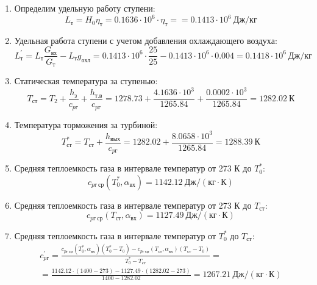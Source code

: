 \documentclass[a4paper,10pt]{article}
\begin{document}
\begin{enumerate}
        
        \item Определим удельную работу ступени:
        \[
            L_т = H_0 \eta_т = 0.1636 \cdot 10^6 \cdot \eta_т =
            = 0.1413 \cdot 10^6 \ Дж/кг
        \]
        

        \item Удельная работа ступени с учетом добавления охлаждающего воздуха:
        \[
            L_т^\prime = L_т \frac{ G_{вх} }{ G_т }  - L_т g_{охл} =
                0.1413 \cdot 10^6 \cdot
                \frac{ 25 }{ 25 }  -
                0.1413 \cdot 10^6 \cdot 0.004 =
            0.1418 \cdot 10^6 \ Дж/кг
        \]

        \item Статическая температура за ступенью:
        \[
            T_{ст} = T_2 + \frac{ h_з }{ c_{pг} } + \frac{ h_{т.в} }{ c_{pг} } =
                1278.73 +
                \frac{4.1636 \cdot 10^3 }{ 1265.84 } +
                \frac{ 0.0002 \cdot 10^3 }{ 1265.84 } =
            1282.02 \ К
        \]

        \item Температура торможения за турбиной:
        \[
            T_{ст}^* = T_{ст} + \frac{ h_{вых} }{ c_{pг} } =
                1282.02 +
                \frac{ 8.0658 \cdot 10^3 }{ 1265.84 } =
            1288.39 \ К
        \]

        \item Средняя теплоемкость газа в интервале температур от 273 К до $T_0^*$:
        \[
            c_{pг\ ср} (T_0^*, \alpha_{вх}) =
            1142.12 \ Дж/(кг \cdot К)
        \]

        \item Средняя теплоемкость газа в интервале температур от 273 К до $T_{ст}$:
        \[
            c_{pг\ ср} (T_{ст}, \alpha_{вх}) =
            1127.49 \ Дж/(кг \cdot К)
        \]

        \item Средняя теплоемкость газа в интервале температур от $T_0^*$ до $T_{ст}$:
        \begin{gather*}
            c_{pг}^\prime = \frac{
		        c_{pг\ ср} (T_0^*, \alpha_{вх}) (T_0^* - T_0) - c_{pг\ ср} (T_{ст}, \alpha_{вх})(T_{ст} - T_0)
		    }{
		        T_0^* - T_{ст}} =\\
            =\frac{
		        1142.12 \cdot
                (1400 - 273) -
		        1127.49 \cdot
                (1282.02 - 273)
		    }{
		        1400 - 1282.02} =
		    1267.21 \ Дж / (кг \cdot К)\\
        \end{gather*}


\end{enumerate}
\end{document}
